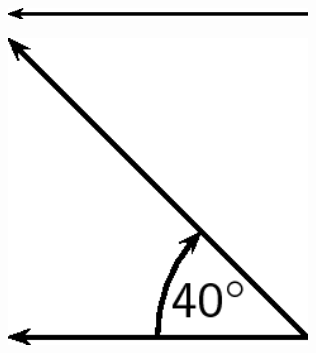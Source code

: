     \addtocounter{footnote}{-0}
    
    \setcounter{subfigure}{0}


	\begin{figure}[H] %
    \begin{center}
    \label{m38812*id187358!!!underscore!!!media}\label{m38812*id187358!!!underscore!!!printimage}\includegraphics[width=300px]{col11305.imgs/m38812_PG11C1_004.png} %
        
      \vspace{2pt}
    \vspace{.1in}
    
    \end{center}

 \end{figure}   

    \addtocounter{footnote}{-0}
    
    \setcounter{subfigure}{0}


	\begin{figure}[H] %
    \begin{center}
    \label{m38812*id187367!!!underscore!!!media}\label{m38812*id187367!!!underscore!!!printimage}\includegraphics[width=300px]{col11305.imgs/m38812_PG11C1_005.png} %
        
      \vspace{2pt}
    \vspace{.1in}
    
    \end{center}

 \end{figure}   

